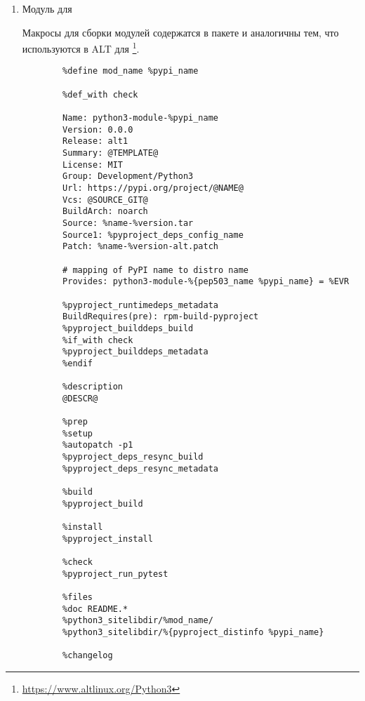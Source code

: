 \begin{enumerate}
	\item Модуль для 
	
	Макросы для сборки модулей  содержатся в пакете  и аналогичны тем, что используются в ALT для \footnote{\href{https://www.altlinux.org/Python3}{https://www.altlinux.org/Python3}}.
	\begin{Verbatim}[breaklines=true,breakanywhere=true,xleftmargin=-2.95cm]
		%define pypi_name @NAME@
		%define mod_name %pypi_name
		
		%def_with check
		
		Name: python3-module-%pypi_name
		Version: 0.0.0
		Release: alt1
		Summary: @TEMPLATE@
		License: MIT
		Group: Development/Python3
		Url: https://pypi.org/project/@NAME@
		Vcs: @SOURCE_GIT@
		BuildArch: noarch
		Source: %name-%version.tar
		Source1: %pyproject_deps_config_name
		Patch: %name-%version-alt.patch
		
		# mapping of PyPI name to distro name
		Provides: python3-module-%{pep503_name %pypi_name} = %EVR
		
		%pyproject_runtimedeps_metadata
		BuildRequires(pre): rpm-build-pyproject
		%pyproject_builddeps_build
		%if_with check
		%pyproject_builddeps_metadata
		%endif
		
		%description
		@DESCR@
		
		%prep
		%setup
		%autopatch -p1
		%pyproject_deps_resync_build
		%pyproject_deps_resync_metadata
		
		%build
		%pyproject_build
		
		%install
		%pyproject_install
		
		%check
		%pyproject_run_pytest
		
		%files
		%doc README.*
		%python3_sitelibdir/%mod_name/
		%python3_sitelibdir/%{pyproject_distinfo %pypi_name}
		
		%changelog
	\end{Verbatim}
\end{enumerate}

